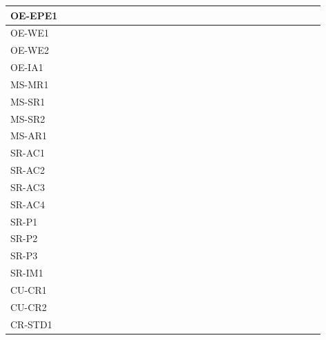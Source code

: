 \documentclass[12pt, titlepage]{article}
\begin{document}
\begin{table}[H]
{\begin{tabular}{|l|l|l|l|l|l|l|l|l|l|l|l|l|l|l|l|l|l|}
      OE-EPE1 & ~ & ~ & ~ & ~ & ~ & ~ & ~ & ~ & ~ & ~ & ~ & ~ & ~ & ~ & ~ & ~ & ~ \\ \hline
      OE-WE1 & ~ & ~ & ~ & ~ & ~ & ~ & ~ & ~ & ~ & ~ & ~ & ~ & ~ & ~ & ~ & ~ & ~ \\ \hline
      OE-WE2 & ~ & ~ & ~ & ~ & ~ & ~ & ~ & ~ & ~ & ~ & ~ & ~ & ~ & ~ & ~ & ~ & ~ \\ \hline
      OE-IA1 & ~ & ~ & ~ & ~ & ~ & ~ & ~ & ~ & ~ & ~ & ~ & ~ & ~ & ~ & ~ & ~ & ~ \\ \hline
      MS-MR1 & ~ & ~ & ~ & ~ & ~ & ~ & ~ & ~ & ~ & ~ & ~ & ~ & ~ & ~ & ~ & ~ & ~ \\ \hline
      MS-SR1 & ~ & ~ & ~ & ~ & ~ & ~ & ~ & ~ & ~ & ~ & ~ & ~ & ~ & ~ & ~ & ~ & ~ \\ \hline
      MS-SR2 & ~ & ~ & ~ & ~ & ~ & ~ & ~ & ~ & ~ & ~ & ~ & ~ & ~ & ~ & ~ & ~ & ~ \\ \hline
      MS-AR1 & ~ & ~ & ~ & ~ & ~ & ~ & ~ & ~ & ~ & ~ & ~ & ~ & ~ & ~ & ~ & ~ & ~ \\ \hline
      SR-AC1 & ~ & ~ & ~ & ~ & ~ & ~ & ~ & ~ & ~ & ~ & ~ & ~ & ~ & ~ & ~ & ~ & ~ \\ \hline
      SR-AC2 & ~ & ~ & ~ & ~ & ~ & ~ & ~ & ~ & ~ & ~ & ~ & ~ & ~ & ~ & ~ & ~ & ~ \\ \hline
      SR-AC3 & ~ & ~ & ~ & ~ & ~ & ~ & ~ & ~ & ~ & ~ & ~ & ~ & ~ & ~ & ~ & ~ & ~ \\ \hline
      SR-AC4 & ~ & ~ & ~ & ~ & ~ & ~ & ~ & ~ & ~ & ~ & ~ & ~ & ~ & ~ & ~ & ~ & ~ \\ \hline
      SR-P1 & ~ & ~ & ~ & ~ & ~ & ~ & ~ & ~ & ~ & ~ & ~ & ~ & ~ & ~ & ~ & ~ & ~ \\ \hline
      SR-P2 & ~ & ~ & ~ & ~ & ~ & ~ & ~ & ~ & ~ & ~ & ~ & ~ & ~ & ~ & ~ & ~ & ~ \\ \hline
      SR-P3 & ~ & ~ & ~ & ~ & ~ & ~ & ~ & ~ & ~ & ~ & ~ & ~ & ~ & ~ & ~ & ~ & ~ \\ \hline
      SR-IM1 & ~ & ~ & ~ & ~ & ~ & ~ & ~ & ~ & ~ & ~ & ~ & ~ & ~ & ~ & ~ & ~ & ~ \\ \hline
      CU-CR1 & ~ & ~ & ~ & ~ & ~ & ~ & ~ & ~ & ~ & ~ & ~ & ~ & ~ & ~ & ~ & ~ & ~ \\ \hline
      CU-CR2 & ~ & ~ & ~ & ~ & ~ & ~ & ~ & ~ & ~ & ~ & ~ & ~ & ~ & ~ & ~ & ~ & ~ \\ \hline
      CR-STD1 & ~ & ~ & ~ & ~ & ~ & ~ & ~ & ~ & ~ & ~ & ~ & ~ & ~ & ~ & ~ & ~ & ~ \\ \hline
  \end{tabular}
  }
\end{table}
\end{document}
